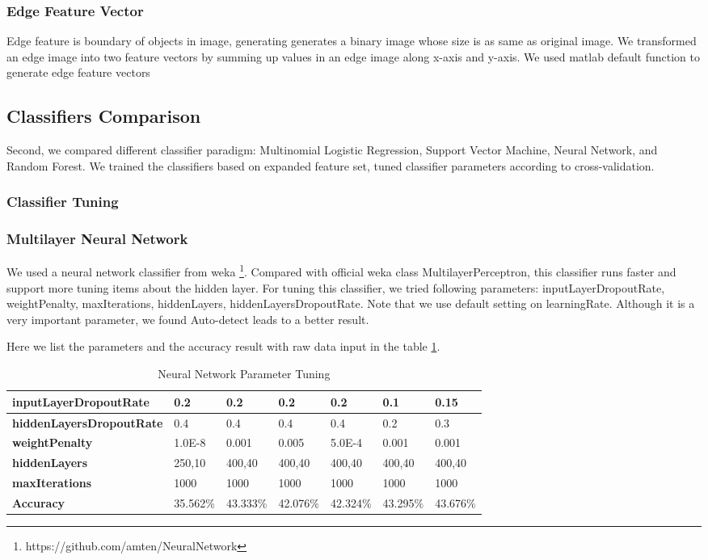 \documentclass{acm_proc_article-sp}
\begin{document}
\subsubsection{Edge Feature Vector}

Edge feature is boundary of objects in image, generating generates a binary image whose size is as same as original image. We transformed an edge image into two feature vectors by summing up values in an edge image along x-axis and y-axis. We used matlab default function to generate edge feature vectors

\subsection{Classifiers Comparison}

Second, we compared different classifier paradigm:  Multinomial Logistic Regression, Support Vector Machine, Neural Network, and Random Forest. We trained the classifiers based on expanded feature set, tuned classifier parameters according to cross-validation.

\subsubsection{Classifier Tuning}

\subsubsection*{Multilayer Neural Network} 
We used a neural network classifier from weka \footnote{https://github.com/amten/NeuralNetwork}. Compared with official weka class MultilayerPerceptron, this classifier runs faster and support more tuning items about the hidden layer.
For tuning this classifier, we tried following parameters: inputLayerDropoutRate, weightPenalty, maxIterations, hiddenLayers, hiddenLayersDropoutRate. Note that we use default setting on learningRate. Although it is a very important parameter, we found Auto-detect leads to a better result.

Here we list the parameters and the accuracy result with raw data input in the table \ref{nn_parameter_tuning}.


\begin{table}[!htb]
\centering
\caption{Neural Network Parameter Tuning}
\begin{tabular}[c]{|l|l|l|l|l|l|l|}
\hline
\textbf{inputLayerDropoutRate} & 0.2 & 0.2 & 0.2 & 0.2 & 0.1 & 0.15 \\ \hline
\textbf{hiddenLayersDropoutRate} & 0.4 & 0.4 & 0.4 & 0.4 & 0.2 & 0.3 \\ \hline
\textbf{weightPenalty} & 1.0E-8 & 0.001 & 0.005 & 5.0E-4 & 0.001 & 0.001 \\ \hline
\textbf{hiddenLayers} & 250,10 & 400,40 & 400,40 & 400,40 & 400,40 & 400,40 \\ \hline
\textbf{maxIterations} & 1000 & 1000 & 1000 & 1000 & 1000 & 1000 \\ \hline
\textbf{Accuracy} & 35.562\% & 43.333\% & 42.076\% & 42.324\% & 43.295\% & 43.676\% \\ \hline
\end{tabular}
\label{nn_parameter_tuning}
\end{table}
\end{document}

